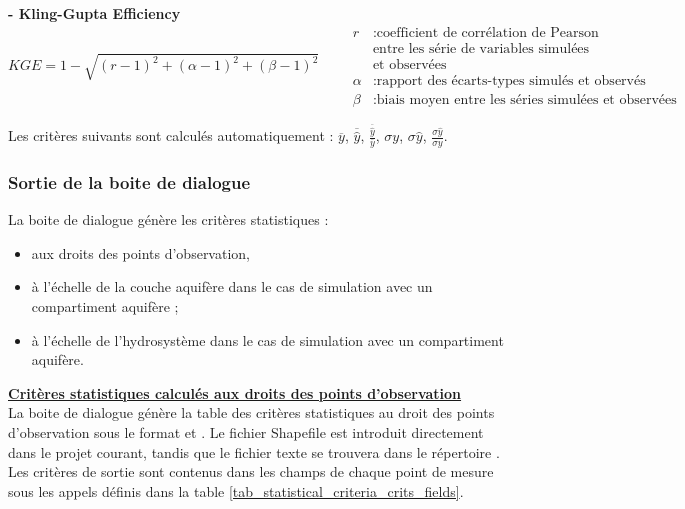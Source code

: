 \textbf{ - Kling-Gupta Efficiency} \citep{gupta2012}
\begin{equation}
    KGE = 1 - \sqrt{(r - 1)^2 + (\alpha - 1)^2 + (\beta - 1)^2} 
    \quad \quad
    \begin{array}{ll}
         r & : \text{coefficient de corrélation de Pearson} \\ 
         & \text{entre les série de variables simulées} \\ 
         & \text{et observées} \\
        \alpha & : \text{rapport des écarts-types simulés et observés} \\
        \beta  & : \text{biais moyen entre les séries simulées et observées}
    \end{array}
\end{equation}





Les critères suivants sont calculés automatiquement : $\overline{y}$, $\overline{\hat{y}}$, $\frac{\overline{\hat{y}}}{\overline{y}}$, $\sigma y$,  $\sigma \hat{y}$, $\frac{\sigma \hat{y}}{\sigma y}$.

\subsubsection{Sortie de la boite de dialogue }
\label{sec_stats_crits}

La boite de dialogue génère les critères statistiques : 
\begin{itemize}
    \item aux droits des points d'observation,  
    \item à l'échelle de la couche aquifère dans le cas de simulation avec un compartiment aquifère ;
    \item à l'échelle de l'hydrosystème dans le cas de simulation avec un compartiment aquifère.
\end{itemize}
\vspace{0.3cm}

\underline{\textbf{Critères statistiques calculés aux droits des points d'observation}}\\
La boite de dialogue génère la table des critères statistiques au droit des points d'observation sous le format  et . Le fichier Shapefile est introduit directement dans le projet  courant, tandis que le fichier texte se trouvera dans le répertoire . 
Les critères de sortie sont contenus dans les champs de chaque point de mesure sous les appels définis dans la table \ref{tab_statistical_criteria_crits_fields}.

